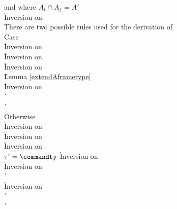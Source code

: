 \begin{description}
\begin{tabbing}
   and  where $A_t \cap A_f = A'$ \\
    \` Inversion on  \\
  There are two possible rules used for the derivation of  \\
  Case  \+ \\
      \` Inversion on  \\
      \` Inversion on  \\
      \` Inversion on  \\
      \` Lemma \ref{extendAframetype} \\
      \` Inversion on  \\
      \`  \\
      \`  \- \\
  Otherwise  \+ \\
      \` Inversion on  \\
      \` Inversion on  \\
      \` Inversion on  \\
    $\tau' = \commandty$
      \` Inversion on  \\
      \` Inversion on  \\
      \`  \\
      \` Inversion on  \\
      \`  \\
      \`  \\


\end{tabbing}
\end{description}
